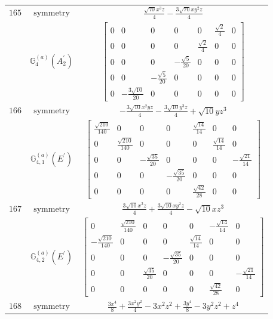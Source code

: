 \documentclass[fleqn,8pt,landscape]{jsarticle}
\begin{document}
\begin{longtable}{ccc}
$ 165 $ & $ \text{symmetry} $ & $ \frac{\sqrt{70} x^{3} z}{4} - \frac{3 \sqrt{70} x y^{2} z}{4} $ \\
$  $ & $ \mathbb{G}_{4}^{(a)}(A_{2}^{\prime}) $ & $ \begin{bmatrix} 0 & 0 & 0 & 0 & 0 & \frac{\sqrt{2}}{4} & 0 \\ 0 & 0 & 0 & 0 & \frac{\sqrt{2}}{4} & 0 & 0 \\ 0 & 0 & 0 & - \frac{\sqrt{5}}{20} & 0 & 0 & 0 \\ 0 & 0 & - \frac{\sqrt{5}}{20} & 0 & 0 & 0 & 0 \\ 0 & - \frac{3 \sqrt{10}}{20} & 0 & 0 & 0 & 0 & 0 \end{bmatrix} $ \\ \hline
$ 166 $ & $ \text{symmetry} $ & $ - \frac{3 \sqrt{10} x^{2} y z}{4} - \frac{3 \sqrt{10} y^{3} z}{4} + \sqrt{10} y z^{3} $ \\
$  $ & $ \mathbb{G}_{4,1}^{(a)}(E^{\prime}) $ & $ \begin{bmatrix} \frac{\sqrt{210}}{140} & 0 & 0 & 0 & \frac{\sqrt{14}}{14} & 0 & 0 \\ 0 & \frac{\sqrt{210}}{140} & 0 & 0 & 0 & \frac{\sqrt{14}}{14} & 0 \\ 0 & 0 & - \frac{\sqrt{35}}{20} & 0 & 0 & 0 & - \frac{\sqrt{21}}{14} \\ 0 & 0 & 0 & - \frac{\sqrt{35}}{20} & 0 & 0 & 0 \\ 0 & 0 & 0 & 0 & \frac{\sqrt{42}}{28} & 0 & 0 \end{bmatrix} $ \\ \hline
$ 167 $ & $ \text{symmetry} $ & $ \frac{3 \sqrt{10} x^{3} z}{4} + \frac{3 \sqrt{10} x y^{2} z}{4} - \sqrt{10} x z^{3} $ \\
$  $ & $ \mathbb{G}_{4,2}^{(a)}(E^{\prime}) $ & $ \begin{bmatrix} 0 & \frac{\sqrt{210}}{140} & 0 & 0 & 0 & - \frac{\sqrt{14}}{14} & 0 \\ - \frac{\sqrt{210}}{140} & 0 & 0 & 0 & \frac{\sqrt{14}}{14} & 0 & 0 \\ 0 & 0 & 0 & - \frac{\sqrt{35}}{20} & 0 & 0 & 0 \\ 0 & 0 & \frac{\sqrt{35}}{20} & 0 & 0 & 0 & - \frac{\sqrt{21}}{14} \\ 0 & 0 & 0 & 0 & 0 & \frac{\sqrt{42}}{28} & 0 \end{bmatrix} $ \\ \hline
$ 168 $ & $ \text{symmetry} $ & $ \frac{3 x^{4}}{8} + \frac{3 x^{2} y^{2}}{4} - 3 x^{2} z^{2} + \frac{3 y^{4}}{8} - 3 y^{2} z^{2} + z^{4} $ \\

\end{longtable}
\end{document}
